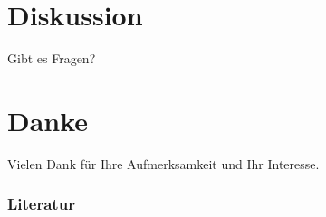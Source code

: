 \documentclass[fleqn,11pt,aspectratio=43]{beamer}
\begin{document}
\section*{Diskussion~}
\begin{frame}[highlight]{\insertsectionhead}
\centering
Gibt es Fragen?
\end{frame}

\section*{Danke~}
\begin{frame}{\insertsectionhead}
\centering
Vielen Dank für Ihre Aufmerksamkeit und Ihr Interesse.
\end{frame}

\begin{frame}[allowframebreaks]
\frametitle{Literatur}
%

\end{frame}
\end{document}
